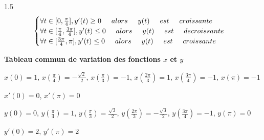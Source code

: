 \documentclass[12pt]{article}
\begin{document}
\begin{spacing}{1.5}
\[
\begin{cases}
\forall t\in [0,\frac{\pi}{4}],y'(t)\geq 0\hspace*{0.5cm} alors\hspace*{0.5cm} y(t)\hspace*{0.5cm} est \hspace*{0.5cm}croissante\\
\forall t\in [\frac{\pi}{4}, \frac{3\pi}{4}], y'(t)\leq 0 \hspace*{0.5cm} alors\hspace*{0.5cm} y(t)\hspace*{0.5cm} est\hspace*{0.5cm} decroissante\\
\forall t\in [\frac{3\pi}{4},\pi], y'(t)\leq 0\hspace*{0.5cm} alors\hspace*{0.5cm} y(t)\hspace*{0.5cm} est\hspace*{0.5cm} croissante
\end{cases}
\]

\medskip\textbf{Tableau commun de variation des fonctions $x$ et $y$}

$x(0)=1$, $x(\frac{\pi}{4})=-\frac{\sqrt{2}}{2}$, $x(\frac{\pi}{3})=-1$, $x(\frac{2\pi}{3})=1$, $x(\frac{3\pi}{4})=-1$, $x(\pi)=-1$

$x'(0)=0$, $x'(\pi)=0$

$y(0)=0$, $y(\frac{\pi}{4})=1$, $y(\frac{\pi}{3})=\frac{\sqrt{3}}{2}$, $y(\frac{2\pi}{3})=-\frac{\sqrt{3}}{2}$, $y(\frac{3\pi}{4})=-1$, $y(\pi)=0$

$y'(0)=2$, $y'(\pi)=2$

\begin{center}
\end{center}
\end{spacing}
\end{document}
